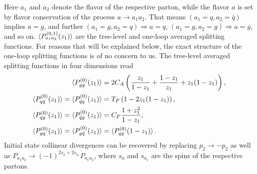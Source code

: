 Here $a_1$ and $a_2$ denote the flavor of the respective parton, while the flavor $a$ is set by flavor conservation of the process $a \rightarrow a_1 a_2$. That means $(a_1 = q,a_2 = \bar{q})$ implies $a = g$, and further $(a_1 = g,a_2 = q) \Rightarrow a = q$, $(a_1 = g,a_2 = g) \Rightarrow a = g$, and so on. $\braket{P^{(0,1)}_{a_1 a_2}(z_1)}$ are the tree-level and one-loop averaged splitting functions. For reasons that will be explained below, the exact structure of the one-loop splitting functions is of no concern to us. The tree-level averaged splitting functions in four dimensions read
\begin{equation}
\begin{split}
\braket{P_{gg}^{(0)}(z_1)} &= 2 C_A \left( \frac{z_1}{1 - z_1} + \frac{1 - z_1}{z_1} + z_1 (1 - z_1) \right), \\
\braket{P_{q \bar{q}}^{(0)} (z_1)} = \braket{P_{\bar{q}q}^{(0)} (z_1)} &= T_F \left(1 - 2 z_1 (1 - z_1) \right), \\
\braket{P_{qg}^{(0)}(z_1)} = \braket{P_{\bar{q}g}^{(0)}(z_1)} &= C_F \frac{1 + z_1^2}{1 - z_1}, \\
\braket{P^{(0)}_{gq}(z_1)} = \braket{P_{g\bar{q}}^{(0)}(z_1)} &= \braket{P_{qg}^{(0)} (1 - z_1)}.
\end{split}
\end{equation}
Initial state collinear divergences can be recovered by replacing $p_2 \rightarrow - p_2$ as well as $P_{a_1 a_2} \rightarrow (-1)^{2 s_a + 2 s_{a_1}} P_{a_1 a_2}$, where $s_a$ and $s_{a_1}$ are the spins of the respective partons.


